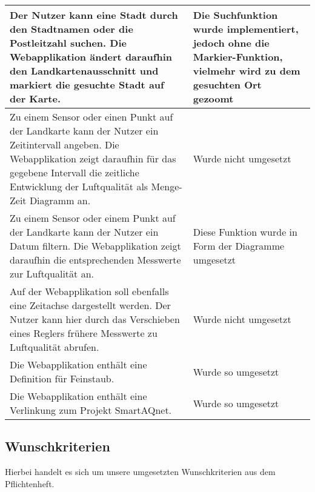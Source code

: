 \begin{tabularx}{\textwidth}{| X | X |}
    \hline
    Der Nutzer kann eine Stadt durch den Stadtnamen oder die Postleitzahl suchen. Die Webapplikation ändert daraufhin den Landkartenausschnitt und markiert die gesuchte Stadt auf der Karte. & Die Suchfunktion wurde implementiert, jedoch ohne die Markier-Funktion, vielmehr wird zu dem gesuchten Ort gezoomt \\
    \hline
    Zu einem Sensor oder einen Punkt auf der Landkarte kann der Nutzer ein Zeitintervall angeben. Die Webapplikation zeigt daraufhin für das gegebene Intervall die zeitliche Entwicklung der Luftqualität als Menge-Zeit Diagramm an. & Wurde nicht umgesetzt \\
    \hline
    Zu einem Sensor oder einem Punkt auf der Landkarte kann der Nutzer ein Datum filtern. Die Webapplikation zeigt daraufhin die entsprechenden Messwerte zur Luftqualität an. & Diese Funktion wurde in Form der Diagramme umgesetzt \\
    \hline
    Auf der Webapplikation soll ebenfalls eine Zeitachse dargestellt werden. Der Nutzer kann hier durch das Verschieben eines Reglers frühere Messwerte zu Luftqualität abrufen.  & Wurde nicht umgesetzt \\
    \hline
    Die Webapplikation enthält eine Definition für \gls{Feinstaub}. & Wurde so umgesetzt \\
    \hline
    Die Webapplikation enthält eine Verlinkung zum Projekt SmartAQnet. & Wurde so umgesetzt \\   
    \hline 
    \end{tabularx}
\subsection{Wunschkriterien}
    Hierbei handelt es sich um unsere umgesetzten Wunschkriterien aus dem Pflichtenheft.
    
